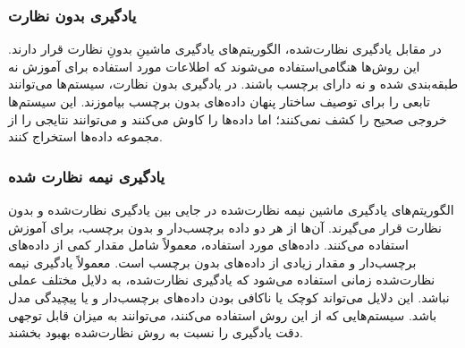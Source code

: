 \subsubsection{یادگیری بدون نظارت}

در مقابل  یادگیری نظارت‌شده، الگوریتم‌های یادگیری ماشینِ بدونِ نظارت قرار دارند. این روش‌ها هنگامی‌استفاده می‌شوند که اطلاعات مورد استفاده برای آموزش نه طبقه‌بندی شده و نه دارای برچسب باشند. در یادگیری بدون نظارت، سیستم‌ها می‌توانند تابعی را برای توصیف ساختار پنهان داده‌های بدون برچسب بیاموزند. این سیستم‌ها خروجی صحیح را کشف نمی‌کنند؛ اما داده‌ها را کاوش می‌کنند و می‌توانند نتایجی را از مجموعه داده‌ها استخراج کنند.


\subsubsection{یادگیری نیمه نظارت شده}

الگوریتم‌های یادگیری ماشین نیمه نظارت‌شده در جایی بین یادگیری نظارت‌شده و بدون نظارت قرار می‌گیرند. آن‌ها از هر دو داده برچسب‌دار و بدون برچسب، برای آموزش استفاده می‌کنند. داده‌های مورد استفاده، معمولاً شامل مقدار کمی از داده‌های برچسب‌دار و مقدار زیادی از داده‌های بدون برچسب است. معمولاً یادگیری نیمه نظارت‌شده زمانی استفاده می‌شود که یادگیری نظارت‌شده، به دلایل مختلف عملی نباشد. این دلایل می‌تواند کوچک یا ناکافی بودن داده‌های برچسب‌دار و یا پیچیدگی مدل باشد. سیستم‌هایی که از این روش استفاده می‌کنند، می‌توانند به میزان قابل توجهی دقت یادگیری را نسبت به روش نظارت‌شده بهبود بخشند. 

